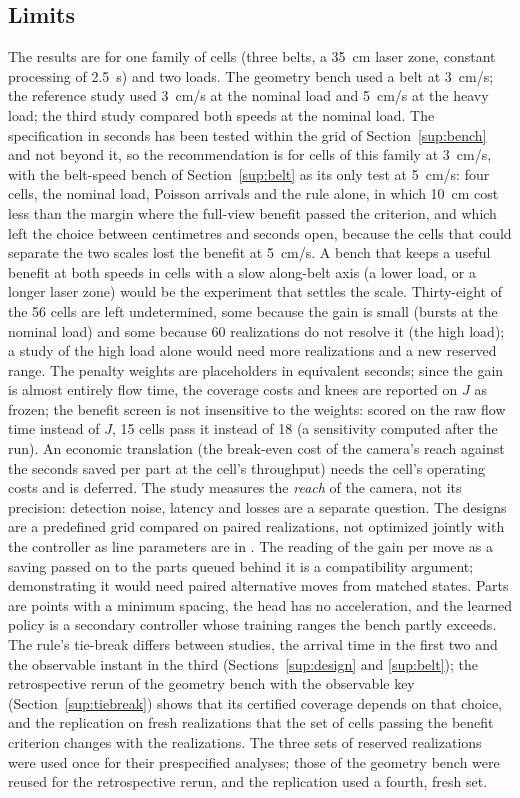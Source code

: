 \documentclass[11pt,a4paper]{article}
\begin{document}
\subsection{Limits}\label{sup:limits}
The results are for one family of cells (three belts, a 35~cm laser zone, constant
processing of 2.5~s) and two loads. The geometry bench used a belt at 3~cm/s; the
reference study used 3~cm/s at the nominal load and 5~cm/s at the heavy load; the third
study compared both speeds at the nominal load. The specification in seconds has been
tested within the grid of Section~\ref{sup:bench} and not beyond it, so the
recommendation is for cells of this family at 3~cm/s, with the belt-speed bench of
Section~\ref{sup:belt} as its only test at 5~cm/s: four cells, the nominal load, Poisson
arrivals and the rule alone, in which 10~cm cost less than the margin where the
full-view benefit passed the criterion, and which left the choice between centimetres and seconds open,
because the cells that could separate the two scales lost the benefit at 5~cm/s. A bench
that keeps a useful benefit at both speeds in cells with a slow along-belt axis (a lower
load, or a longer laser zone) would be the experiment that settles the scale. Thirty-eight of the
56 cells are left undetermined, some because the gain is small (bursts at the nominal
load) and some because 60 realizations do not resolve it (the high load); a study of the
high load alone would need more realizations and a new reserved range. The penalty
weights are placeholders in equivalent seconds; since the gain is almost entirely flow
time, the coverage costs and knees are reported on $J$ as frozen; the benefit screen is
not insensitive to the weights: scored on the raw flow time instead of $J$, 15 cells pass
it instead of 18 (a sensitivity computed after the run). An economic translation (the break-even
cost of the camera's reach against the seconds saved per part at the cell's throughput)
needs the cell's operating costs and is deferred. The study measures the \emph{reach} of
the camera, not its precision: detection noise, latency and losses are a separate
question. The designs are a predefined grid compared on paired realizations, not optimized
jointly with the controller as line parameters are in \cite{Sarker2001}. The reading of the
gain per move as a saving passed on to the parts queued behind it is a compatibility
argument; demonstrating it would need paired alternative moves from matched states. Parts
are points with a minimum spacing, the head has no acceleration, and the learned policy is a
secondary controller whose training ranges the bench partly exceeds.
The rule's tie-break differs between studies, the arrival time in the first two and the
observable instant in the third (Sections~\ref{sup:design} and \ref{sup:belt}); the
retrospective rerun of the geometry bench with the observable key
(Section~\ref{sup:tiebreak}) shows that its certified coverage depends on that choice, and
the replication on fresh realizations that the set of cells passing the benefit criterion
changes with the realizations. The three sets of reserved realizations were used once for
their prespecified analyses; those of the geometry bench were reused for the retrospective
rerun, and the replication used a fourth, fresh set.



\end{document}
